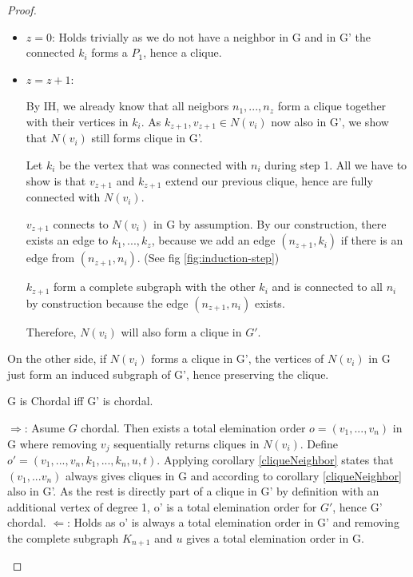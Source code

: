 \begin{proof}
\begin{subproof}
        \begin{itemize}
            \item $z = 0$: Holds trivially as we do not have a neighbor in G and in G' the connected $k_i$ forms a $P_1$, hence a clique.
            \item $z = z + 1$: 

            By IH, we already know that all neigbors $n_1,...,n_z$ form a clique together with their vertices in $k_{i}$. As $k_{z+1}, v_{z+1} \in N(v_i)$ now also in G', we show that $N(v_i)$ still forms clique in G'.

            Let $k_i$ be the vertex that was connected with $n_i$ during step 1. All we have to show is that $v_{z+1}$ and $k_{z+1}$ extend our previous clique, hence are fully connected with $N(v_i)$.
            
            $v_{z+1}$ connects to $N(v_i)$ in G by assumption. By our construction, there exists an edge to $k_1,...,k_z$, because we add an edge $(n_{z+1}, k_i)$ if there is an edge from $(n_{z+1}, n_i)$. (See fig \ref{fig:induction-step})

            $k_{z+1}$ form a complete subgraph with the other $k_i$ and is connected to all $n_i$ by construction because the edge $(n_{z+1},n_i)$ exists.  


            Therefore, $N(v_i)$ will also form a clique in $G'$.
        \end{itemize}

        On the other side, if $N(v_i)$ forms a clique in G', the vertices of $N(v_i)$ in G just form an induced subgraph of G', hence preserving the clique.
        
    \end{subproof}
   
    \begin{corollary}
    G is Chordal iff G' is chordal.    
    \end{corollary}
    \begin{subproof}
    $\Rightarrow$: Asume $G$ chordal. Then exists a total elemination order $o = (v_1, ..., v_n)$ in G where removing $v_j$ sequentially returns cliques in $N(v_i)$.
    Define $o' = (v_1, ..., v_n, k_1, ..., k_n, u, t)$. Applying corollary \ref*{cliqueNeighbor} states that $(v_1, ... v_n)$ always gives cliques in G and according to corollary \ref*{cliqueNeighbor} also in G'. As the rest is directly part of a clique in G' by definition with an additional vertex of degree 1, o' is a total elemination order for $G'$, hence G' chordal.
    $\Leftarrow$: Holds as o' is always a total elemination order in G' and removing  the complete subgraph $K_{n+1}$ and $u$ gives a total elemination order in G.
    \end{subproof}



\end{proof}
